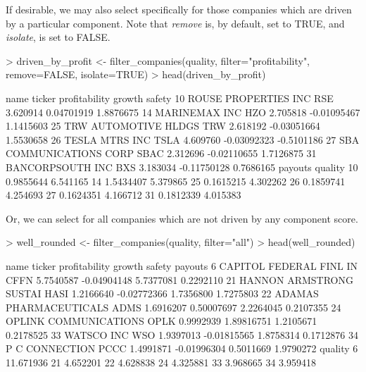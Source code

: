 \documentclass[titlepage]{article}
\begin{document}
If desirable, we may also select specifically for those companies which are driven by a particular component. Note that \textit{remove} is, by default, set to TRUE, and \textit{isolate}, is set to FALSE.

\begin{Schunk}
\begin{Sinput}
> driven_by_profit <- filter_companies(quality, filter="profitability", remove=FALSE, isolate=TRUE)
> head(driven_by_profit)
\end{Sinput}
\begin{Soutput}
                      name ticker profitability      growth     safety
10    ROUSE PROPERTIES INC    RSE      3.620914  0.04701919  1.8876675
14           MARINEMAX INC    HZO      2.705818 -0.01095467  1.1415603
25    TRW AUTOMOTIVE HLDGS    TRW      2.618192 -0.03051664  1.5530658
26          TESLA MTRS INC   TSLA      4.609760 -0.03092323 -0.5101186
27 SBA COMMUNICATIONS CORP   SBAC      2.312696 -0.02110655  1.7126875
31        BANCORPSOUTH INC    BXS      3.183034 -0.11750128  0.7686165
     payouts  quality
10 0.9855644 6.541165
14 1.5434407 5.379865
25 0.1615215 4.302262
26 0.1859741 4.254693
27 0.1624351 4.166712
31 0.1812339 4.015383
\end{Soutput}
\end{Schunk}

Or, we can select for all companies which are not driven by any component score.

\begin{Schunk}
\begin{Sinput}
> well_rounded <- filter_companies(quality, filter="all")
> head(well_rounded)
\end{Sinput}
\begin{Soutput}
                      name ticker profitability      growth    safety   payouts
6  CAPITOL FEDERAL FINL IN   CFFN     5.7540587 -0.04904148 5.7377081 0.2292110
21 HANNON ARMSTRONG SUSTAI   HASI     1.2166640 -0.02772366 1.7356800 1.7275803
22  ADAMAS PHARMACEUTICALS   ADMS     1.6916207  0.50007697 2.2264045 0.2107355
24   OPLINK COMMUNICATIONS   OPLK     0.9992939  1.89816751 1.2105671 0.2178525
33              WATSCO INC    WSO     1.9397013 -0.01815565 1.8758314 0.1712876
34          P C CONNECTION   PCCC     1.4991871 -0.01996304 0.5011669 1.9790272
     quality
6  11.671936
21  4.652201
22  4.628838
24  4.325881
33  3.968665
34  3.959418
\end{Soutput}
\end{Schunk}
\end{document}
